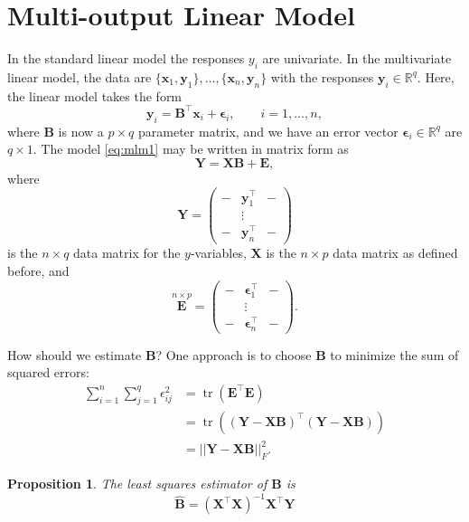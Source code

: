 \documentclass[
]{book}
\newtheorem{proposition}{Proposition}[chapter]
\theoremstyle{definition}
\theoremstyle{definition}
\theoremstyle{definition}
\theoremstyle{definition}
\theoremstyle{remark}
\begin{document}
\hypertarget{multi-output-linear-model}{%
\section{Multi-output Linear Model}\label{multi-output-linear-model}}

In the standard linear model the responses \(y_i\) are univariate. In the multivariate linear model, the data are \(\{\mathbf x_1, \mathbf y_1\}, \ldots, \{\mathbf x_n, \mathbf y_n\}\) with the responses \(\mathbf y_i \in \mathbb{R}^q\). Here, the linear model takes the form
\begin{equation}
\mathbf y_i= \mathbf B^\top \mathbf x_i +{\pmb \epsilon}_i, \qquad i=1, \ldots , n,
\label{eq:mlm1}
\end{equation}
where \(\mathbf B\) is now a \(p \times q\) parameter matrix, and we have an error vector \({\pmb \epsilon}_i\in \mathbb{R}^q\) are \(q \times 1\). The model \eqref{eq:mlm1} may be written in matrix form as
\begin{equation}
\mathbf Y= \mathbf X\mathbf B+\mathbf E,
\label{eq:mlm2}
\end{equation}
where \[\mathbf Y=
\begin{pmatrix} - & \mathbf y_1^\top &-\\
&\vdots&\\
-&\mathbf y_n^\top&-\end{pmatrix}\] is the \(n \times q\) data matrix for the \(y\)-variables, \(\mathbf X\) is the \(n \times p\) data matrix as defined before, and \[\stackrel{n \times p}{\mathbf E}=\begin{pmatrix} - & \boldsymbol \epsilon_1^\top &-\\
&\vdots&\\
-&\boldsymbol \epsilon_n^\top&-\end{pmatrix}.\]

How should we estimate \(\mathbf B\)? One approach is to choose \(\mathbf B\) to minimize the sum of squared errors:
\begin{align}\sum_{i=1}^n\sum_{j=1}^q \epsilon_{ij}^2 &= \operatorname{tr}(\mathbf E^\top \mathbf E) \\
&= \operatorname{tr}((\mathbf Y-\mathbf X\mathbf B)^\top(\mathbf Y-\mathbf X\mathbf B))\\
&=||\mathbf Y-\mathbf X\mathbf B||_F^2.
\end{align}

\begin{proposition}
\protect\hypertarget{prp:eight1}{}\label{prp:eight1}The least squares estimator of \(\mathbf B\) is
\begin{equation}
\hat{\mathbf B}= (\mathbf X^\top \mathbf X)^{-1}\mathbf X^\top \mathbf Y
\label{eq:MVbeta}
\end{equation}
\end{proposition}
\end{document}
